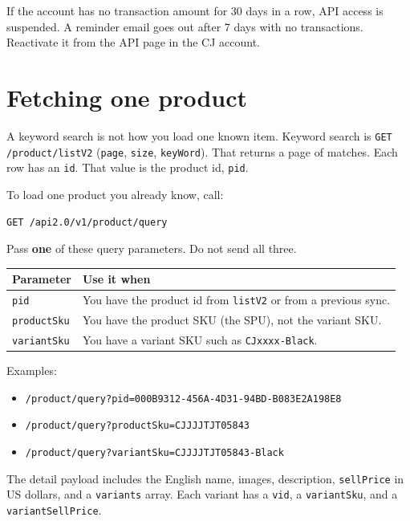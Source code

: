 \documentclass[11pt]{article}
\begin{document}
If the account has no transaction amount for 30 days in a row, API access is suspended. A reminder email goes out after 7 days with no transactions. Reactivate it from the API page in the CJ account.

\section{Fetching one product}

A keyword search is not how you load one known item. Keyword search is \texttt{GET /product/listV2} (\texttt{page}, \texttt{size}, \texttt{keyWord}). That returns a page of matches. Each row has an \texttt{id}. That value is the product id, \texttt{pid}.

To load one product you already know, call:

\begin{center}
\texttt{GET /api2.0/v1/product/query}
\end{center}

Pass \textbf{one} of these query parameters. Do not send all three.

\begin{center}
\begin{tabular}{@{}ll@{}}
\toprule
Parameter & Use it when \\
\midrule
\texttt{pid} & You have the product id from \texttt{listV2} or from a previous sync. \\
\texttt{productSku} & You have the product SKU (the SPU), not the variant SKU. \\
\texttt{variantSku} & You have a variant SKU such as \texttt{CJxxxx-Black}. \\
\bottomrule
\end{tabular}
\end{center}

Examples:

\begin{itemize}
  \item \texttt{/product/query?pid=000B9312-456A-4D31-94BD-B083E2A198E8}
  \item \texttt{/product/query?productSku=CJJJJTJT05843}
  \item \texttt{/product/query?variantSku=CJJJJTJT05843-Black}
\end{itemize}

The detail payload includes the English name, images, description, \texttt{sellPrice} in US dollars, and a \texttt{variants} array. Each variant has a \texttt{vid}, a \texttt{variantSku}, and a \texttt{variantSellPrice}.
\end{document}
